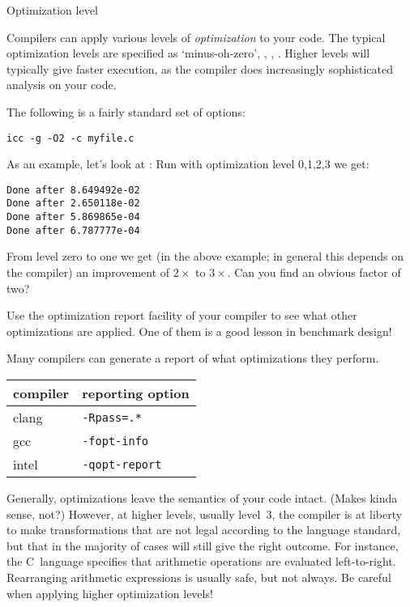  {Optimization level}

Compilers can apply various levels of
\emph{optimization} to your code. The
typical optimization levels are specified as  `minus-oh-zero',
, , . Higher levels will typically give faster
execution, as the compiler does increasingly sophisticated analysis on
your code.

The following is a fairly standard set of options:
\begin{verbatim}
icc -g -O2 -c myfile.c
\end{verbatim}

As an example, let's look at :
Run with optimization level 0,1,2,3 we get:
\begin{verbatim}
Done after 8.649492e-02
Done after 2.650118e-02
Done after 5.869865e-04
Done after 6.787777e-04
\end{verbatim}
\begin{exercise}
  \label{ex:givens-optimize}
  From level zero to one we get (in the above example;
  in general this depends on the compiler) an improvement
  of $2\times$ to $3\times$. Can you find an obvious factor of two?

  Use the optimization report facility of your compiler to see what
  other optimizations are applied. One of them is a good lesson in
  benchmark design!
\end{exercise}

Many compilers can generate a report of what optimizations they perform.

\begin{tabular}{ll}
  \toprule
  compiler&reporting option\\
  \midrule
  clang& \texttt{-Rpass=.*}\\
  gcc&   \texttt{-fopt-info}\\
  intel& \texttt{-qopt-report}\\
  \bottomrule
\end{tabular}

Generally, optimizations leave the semantics of your code
intact. (Makes kinda sense, not?)  However, at higher levels,
usually level~3, the compiler is
at liberty to make transformations that are not legal
according to the language standard, but that in the majority of cases
will still give the right outcome. For instance, the C~language
specifies that arithmetic operations are evaluated left-to-right.
Rearranging arithmetic expressions is usually safe, but not always.
Be careful when applying higher optimization levels!

